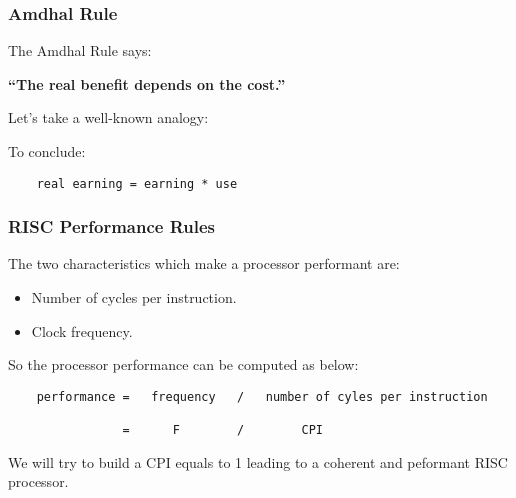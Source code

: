 
\begin{frame}[containsverbatim]
  \frametitle{Amdhal Rule}

  The Amdhal Rule says:

  \nl

  \textbf{``The real benefit depends on the cost.''}

  \nl

  Let's take a well-known analogy:

  \begin{center}
  \end{center}

  To conclude:

  \begin{verbatim}
    real earning = earning * use
  \end{verbatim}
\end{frame}


\begin{frame}[containsverbatim]
  \frametitle{RISC Performance Rules}

  The two characteristics which make a processor performant are:

  \begin{itemize}
    \item
      Number of cycles per instruction.
    \item
      Clock frequency.
  \end{itemize}

  So the processor performance can be computed as below:

  \begin{verbatim}
    performance =   frequency   /   number of cyles per instruction

                =      F        /        CPI
  \end{verbatim}

  We will try to build a CPI equals to 1 leading to a coherent and peformant
  RISC processor.
\end{frame}


